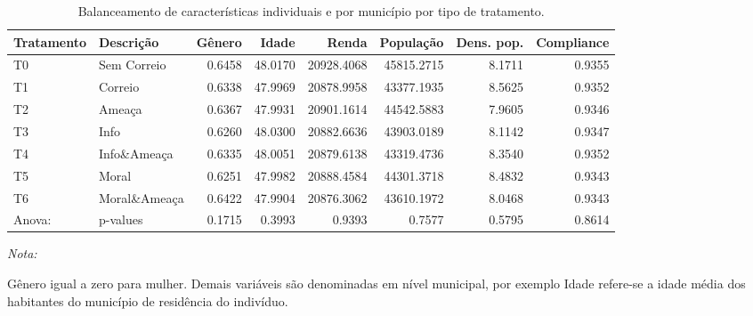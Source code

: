 \begin{table}[H]

\caption{\label{tab:tab1}Balanceamento de características individuais e por município por tipo de tratamento.}
\centering
\fontsize{10}{12}\selectfont
\begin{threeparttable}
\begin{tabular}[t]{llrrrrrr}
\toprule
Tratamento & Descrição & Gênero & Idade & Renda & População & Dens. pop. & Compliance\\
\midrule
T0 & Sem Correio & 0.6458 & 48.0170 & 20928.4068 & 45815.2715 & 8.1711 & 0.9355\\
T1 & Correio & 0.6338 & 47.9969 & 20878.9958 & 43377.1935 & 8.5625 & 0.9352\\
T2 & Ameaça & 0.6367 & 47.9931 & 20901.1614 & 44542.5883 & 7.9605 & 0.9346\\
T3 & Info & 0.6260 & 48.0300 & 20882.6636 & 43903.0189 & 8.1142 & 0.9347\\
T4 & Info\&Ameaça & 0.6335 & 48.0051 & 20879.6138 & 43319.4736 & 8.3540 & 0.9352\\
\addlinespace
T5 & Moral & 0.6251 & 47.9982 & 20888.4584 & 44301.3718 & 8.4832 & 0.9343\\
T6 & Moral\&Ameaça & 0.6422 & 47.9904 & 20876.3062 & 43610.1972 & 8.0468 & 0.9343\\
Anova: & p-values & 0.1715 & 0.3993 & 0.9393 & 0.7577 & 0.5795 & 0.8614\\
\bottomrule
\end{tabular}
\begin{tablenotes}
\item \textit{Nota:} 
\item Gênero igual a zero para mulher. Demais variáveis são denominadas em nível municipal, por exemplo Idade refere-se a idade média dos habitantes do município de residência do indivíduo.
\end{tablenotes}
\end{threeparttable}
\end{table}
